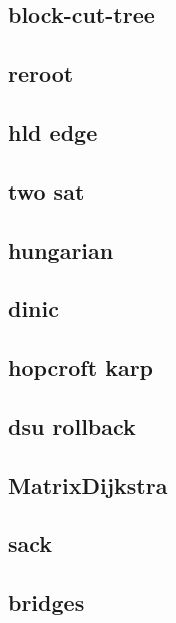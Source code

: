 \subsection{block-cut-tree}
\raggedbottom
\hrulefill
\subsection{reroot}
\raggedbottom
\hrulefill
\subsection{hld edge}
\raggedbottom
\hrulefill
\subsection{two sat}
\raggedbottom
\hrulefill
\subsection{hungarian}
\raggedbottom
\hrulefill
\subsection{dinic}
\raggedbottom
\hrulefill
\subsection{hopcroft karp}
\raggedbottom
\hrulefill
\subsection{dsu rollback}
\raggedbottom
\hrulefill
\subsection{MatrixDijkstra}
\raggedbottom
\hrulefill
\subsection{sack}
\raggedbottom
\hrulefill
\subsection{bridges}
\raggedbottom
\hrulefill
